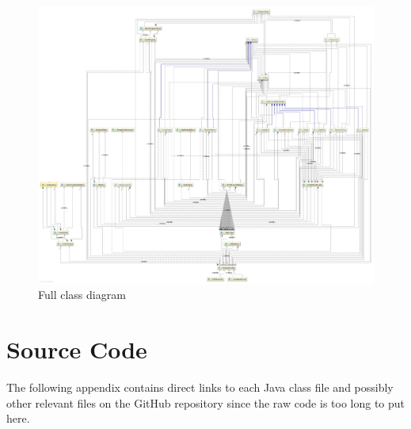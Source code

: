 \documentclass[12p]{article}
\begin{document}
\begin{figure}[ht]
  \centering
  \includegraphics[width=1\textwidth]{Documentation/class_diagram}
  \caption{Full class diagram}
  \label{fig:ClassDiagramFull}
\end{figure}


\section{Source Code} \label{SourceCode}

The following appendix contains direct links to each Java class file and possibly other relevant files on the GitHub repository since the raw code is too long to put here.

\newpage
\end{document}
